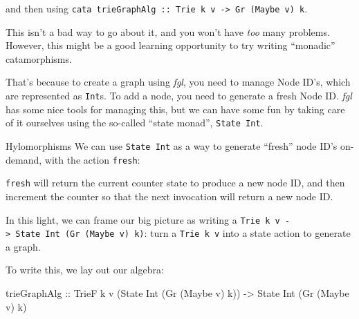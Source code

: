 \documentclass[]{article}
\newenvironment{Shaded}{}{}
\newcommand{\CommentTok}[1]{\textcolor[rgb]{0.38,0.63,0.69}{\textit{#1}}}
\newcommand{\DataTypeTok}[1]{\textcolor[rgb]{0.56,0.13,0.00}{#1}}
\newcommand{\DecValTok}[1]{\textcolor[rgb]{0.25,0.63,0.44}{#1}}
\newcommand{\FunctionTok}[1]{\textcolor[rgb]{0.02,0.16,0.49}{#1}}
\newcommand{\NormalTok}[1]{#1}
\newcommand{\OtherTok}[1]{\textcolor[rgb]{0.00,0.44,0.13}{#1}}
\begin{document}
and then using
\texttt{cata\ trieGraphAlg\ ::\ Trie\ k\ v\ -\textgreater{}\ Gr\ (Maybe\ v)\ k}.

This isn't a bad way to go about it, and you won't have \emph{too} many
problems. However, this might be a good learning opportunity to try writing
``monadic'' catamorphisms.

That's because to create a graph using \emph{fgl}, you need to manage Node ID's,
which are represented as \texttt{Int}s. To add a node, you need to generate a
fresh Node ID. \emph{fgl} has some nice tools for managing this, but we can have
some fun by taking care of it ourselves using the so-called ``state monad'',
\texttt{State\ Int}.

Hylomorphisms We can use \texttt{State\ Int} as a way to generate ``fresh'' node
ID's on-demand, with the action \texttt{fresh}:

\begin{Shaded}
\end{Shaded}

\texttt{fresh} will return the current counter state to produce a new node ID,
and then increment the counter so that the next invocation will return a new
node ID.

In this light, we can frame our big picture as writing a
\texttt{Trie\ k\ v\ -\textgreater{}\ State\ Int\ (Gr\ (Maybe\ v)\ k)}: turn a
\texttt{Trie\ k\ v} into a state action to generate a graph.

To write this, we lay out our algebra:

\begin{Shaded}
\begin{Highlighting}[]
\NormalTok{trieGraphAlg}
\OtherTok{    ::} \DataTypeTok{TrieF}\NormalTok{ k v (}\DataTypeTok{State} \DataTypeTok{Int}\NormalTok{ (}\DataTypeTok{Gr}\NormalTok{ (}\DataTypeTok{Maybe}\NormalTok{ v) k))}
    \OtherTok{->} \DataTypeTok{State} \DataTypeTok{Int}\NormalTok{ (}\DataTypeTok{Gr}\NormalTok{ (}\DataTypeTok{Maybe}\NormalTok{ v) k)}
\end{Highlighting}
\end{Shaded}
\end{document}
